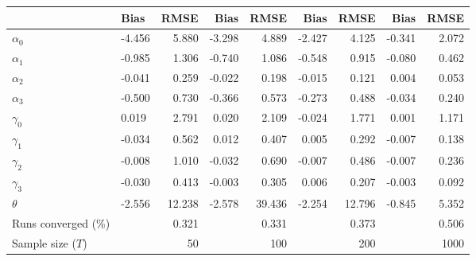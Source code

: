 
\begin{tabular}[t]{llrrrrrrr}
\toprule
  & Bias & RMSE & Bias & RMSE & Bias & RMSE & Bias & RMSE\\
\midrule
$\alpha_{0}$ & -4.456 & 5.880 & -3.298 & 4.889 & -2.427 & 4.125 & -0.341 & 2.072\\
$\alpha_{1}$ & -0.985 & 1.306 & -0.740 & 1.086 & -0.548 & 0.915 & -0.080 & 0.462\\
$\alpha_{2}$ & -0.041 & 0.259 & -0.022 & 0.198 & -0.015 & 0.121 & 0.004 & 0.053\\
$\alpha_{3}$ & -0.500 & 0.730 & -0.366 & 0.573 & -0.273 & 0.488 & -0.034 & 0.240\\
$\gamma_{0}$ & 0.019 & 2.791 & 0.020 & 2.109 & -0.024 & 1.771 & 0.001 & 1.171\\
$\gamma_{1}$ & -0.034 & 0.562 & 0.012 & 0.407 & 0.005 & 0.292 & -0.007 & 0.138\\
$\gamma_{2}$ & -0.008 & 1.010 & -0.032 & 0.690 & -0.007 & 0.486 & -0.007 & 0.236\\
$\gamma_{3}$ & -0.030 & 0.413 & -0.003 & 0.305 & 0.006 & 0.207 & -0.003 & 0.092\\
$\theta$ & -2.556 & 12.238 & -2.578 & 39.436 & -2.254 & 12.796 & -0.845 & 5.352\\
Runs converged (\%) &  & 0.321 &  & 0.331 &  & 0.373 &  & 0.506\\
Sample size ($T$) &  & 50 &  & 100 &  & 200 &  & 1000\\
\bottomrule
\end{tabular}
